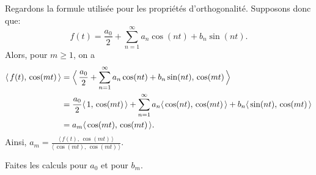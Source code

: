 Regardons la formule utilisée pour les propriétés d'orthogonalité. Supposons donc que:  
\begin{equation*}
f(t) = \frac{a_0}{2} + \sum_{n=1}^\infty a_n \cos (n t) + b_n
\sin (n t) .
\end{equation*}
Alors, pour $m \geq 1$, on a
\begin{equation*}
\begin{split}
\langle \, f(t),\,\cos (mt) \, \rangle
& =
\Bigl\langle \, \frac{a_0}{2} + \sum_{n=1}^\infty a_n \cos (n t) + b_n
\sin (n t),\, \cos (mt) \, \Bigr\rangle \\
& =
\frac{a_0}{2}
\langle \, 1, \, \cos (mt) \, \rangle
+ \sum_{n=1}^\infty
a_n \langle \, \cos (nt), \, \cos (mt) \, \rangle +
b_n \langle \, \sin (n t), \, \cos (mt) \, \rangle \\
& =
a_m \langle \, \cos (mt), \, \cos (mt) \, \rangle .
\end{split}
\end{equation*}
Ainsi,
$a_m =
\frac{\langle \, f(t), \, \cos (mt) \, \rangle}{\langle \, \cos (mt), \,
\cos (mt) \, \rangle}$.

\begin{exercise}
Faites les calculs pour $a_0$ et pour $b_m$.
\end{exercise}

